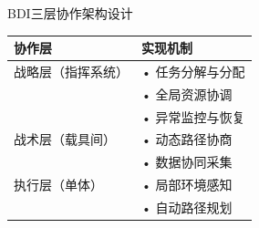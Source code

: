 \documentclass[
10pt,
aspectratio=169,
]{beamer}
\begin{document}
\begin{frame}{BDI三层协作架构设计}
        \begin{center}
        \begin{tabular}{|>{\centering\arraybackslash}p{3.5cm}|>{\raggedright\arraybackslash}p{7cm}|}
        \hline
        \textbf{协作层} & \textbf{实现机制} \\
        \hline
        \rowcolor{lightgray}
        战略层（指挥系统） & • 任务分解与分配\\
        & • 全局资源协调\\
        & • 异常监控与恢复\\
        \hline
        战术层（载具间） & • 动态路径协商\\
        & • 数据协同采集\\
        \hline
        \rowcolor{lightgray}
        执行层（单体） & • 局部环境感知\\
        & • 自动路径规划\\
        \hline
        \end{tabular}
        \end{center}


\end{frame}
\end{document}
